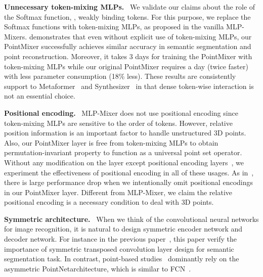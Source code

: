 \noindent \textbf{Unnecessary token-mixing MLPs.} \
We validate our claims about the role of the Softmax function, \ie, weakly binding tokens. For this purpose, we replace the Softmax functions with token-mixing MLPs, as proposed in the vanilla MLP-Mixers.  demonstrates that even without explicit use of token-mixing MLPs, our PointMixer successfully achieves similar accuracy in semantic segmentation and point reconstruction. Moreover, it takes 3 days for training the PointMixer with token-mixing MLPs while our original PointMixer requires a day (twice faster) with less parameter consumption (18\% less). These results are consistently support to Metaformer~\cite{metaformer} and Synthesizer~\cite{synthesizer} in that dense token-wise interaction is not an essential choice.

\noindent \textbf{Positional encoding.} \
MLP-Mixer does not use positional encoding since token-mixing MLPs are sensitive to the order of tokens. However, relative position information is an important factor to handle unstructured 3D points. Also, our PointMixer layer is free from token-mixing MLPs to obtain permutation-invariant property to function as a universal point set operator. Without any modification on the layer except positional encoding layers~, we experiment the effectiveness of positional encoding in all of these usages. As in~, there is large performance drop when we intentionally omit positional encodings in our PointMixer layer. 
Different from MLP-Mixer, we claim the relative positional encoding is a necessary condition to deal with 3D points.

\noindent \textbf{Symmetric architecture.} \
When we think of the convolutional neural networks for image recognition, it is natural to design symmetric encoder network and decoder network. For instance in the previous paper~\cite{deconvnet}, this paper verify the importance of symmetric transposed convolution layer design for semantic segmentation task. In contrast, point-based studies~\cite{point-transformer,zhao2019pointweb} dominantly rely on the asymmetric PointNet\plusplus architecture, which is similar to FCN~\cite{long2015fully}.

